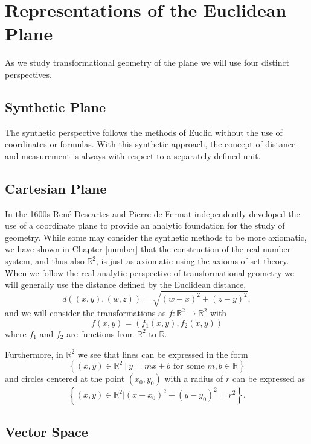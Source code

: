 \documentclass[
]{book}
\let\stdsection\section
\renewcommand\section{\newpage\stdsection}
\theoremstyle{definition}
\theoremstyle{definition}
\theoremstyle{definition}
\theoremstyle{definition}
\theoremstyle{remark}
\begin{document}
\hypertarget{representations-of-the-euclidean-plane}{%
\section{Representations of the Euclidean Plane}\label{representations-of-the-euclidean-plane}}

As we study transformational geometry of the plane we will use four distinct perspectives.

\hypertarget{synthetic-plane}{%
\subsection{Synthetic Plane}\label{synthetic-plane}}

The synthetic perspective follows the methods of Euclid without the use of coordinates or formulas. With this synthetic approach, the concept of distance and measurement is always with respect to a separately defined unit.

\hypertarget{cartesian-plane}{%
\subsection{Cartesian Plane}\label{cartesian-plane}}

In the 1600s René Descartes and Pierre de Fermat independently developed the use of a coordinate plane to provide an analytic foundation for the study of geometry. While some may consider the synthetic methods to be more axiomatic, we have shown in Chapter \ref{number} that the construction of the real number system, and thus also \(\mathbb{R}^2\), is just as axiomatic using the axioms of set theory. When we follow the real analytic perspective of transformational geometry we will generally use the distance defined by the Euclidean distance, \[d\left( (x,y),(w,z)\right) = \sqrt{(w-x)^2+(z-y)^2},\] and we will consider the transformations as
\(f:\mathbb{R}^2 \rightarrow \mathbb{R}^2\) with \[f(x,y)= \left( f_1(x,y), f_2(x,y)\right)\] where \(f_1\) and \(f_2\) are functions from \(\mathbb{R}^2\) to \(\mathbb{R}\).

Furthermore, in \(\mathbb{R}^2\) we see that lines can be expressed in the form \[\left\{ (x,y) \in \mathbb{R}^2 \: \vert \: y=mx+b \mbox{ for some } m,b\in \mathbb{R}\right\}\] and circles centered at the point \((x_0,y_0)\) with a radius of \(r\) can be expressed as \[\left\{ (x,y)\in \mathbb{R}^2 \vert (x-x_0)^2 + (y-y_0)^2 = r^2\right\}.\]

\hypertarget{vector-space}{%
\subsection{Vector Space}\label{vector-space}}
\end{document}
